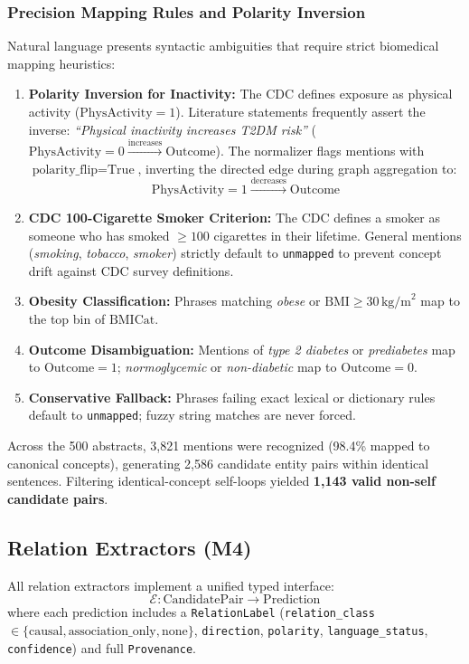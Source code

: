 \documentclass[11pt,a4paper]{article}
\begin{document}
\subsubsection{Precision Mapping Rules and Polarity Inversion}
Natural language presents syntactic ambiguities that require strict biomedical mapping heuristics:
\begin{enumerate}[leftmargin=1.5em]
    \item \textbf{Polarity Inversion for Inactivity:} The CDC defines exposure as physical activity ($\text{PhysActivity}=1$). Literature statements frequently assert the inverse: \textit{``Physical inactivity increases T2DM risk''} ($\text{PhysActivity}=0 \xrightarrow{\text{increases}} \text{Outcome}$). The normalizer flags mentions with $\text{polarity\_flip} = \text{True}$, inverting the directed edge during graph aggregation to:
    \begin{equation}
        \text{PhysActivity}=1 \xrightarrow{\text{decreases}} \text{Outcome}
    \end{equation}
    \item \textbf{CDC 100-Cigarette Smoker Criterion:} The CDC defines a smoker as someone who has smoked $\ge 100$ cigarettes in their lifetime. General mentions (\textit{smoking}, \textit{tobacco}, \textit{smoker}) strictly default to \texttt{unmapped} to prevent concept drift against CDC survey definitions.
    \item \textbf{Obesity Classification:} Phrases matching \textit{obese} or $\text{BMI} \ge 30\,\text{kg/m}^2$ map to the top bin of $\text{BMICat}$.
    \item \textbf{Outcome Disambiguation:} Mentions of \textit{type 2 diabetes} or \textit{prediabetes} map to $\text{Outcome}=1$; \textit{normoglycemic} or \textit{non-diabetic} map to $\text{Outcome}=0$.
    \item \textbf{Conservative Fallback:} Phrases failing exact lexical or dictionary rules default to \texttt{unmapped}; fuzzy string matches are never forced.
\end{enumerate}
Across the 500 abstracts, 3,821 mentions were recognized (98.4\% mapped to canonical concepts), generating 2,586 candidate entity pairs within identical sentences. Filtering identical-concept self-loops yielded \textbf{1,143 valid non-self candidate pairs}.

\subsection{Relation Extractors (M4)}
All relation extractors implement a unified typed interface:
\begin{equation}
    \mathcal{E}: \text{CandidatePair} \rightarrow \text{Prediction}
\end{equation}
where each prediction includes a \texttt{RelationLabel} (\texttt{relation\_class} $\in \{\text{causal}, \text{association\_only}, \text{none}\}$, \texttt{direction}, \texttt{polarity}, \texttt{language\_status}, \texttt{confidence}) and full \texttt{Provenance}.
\end{document}
